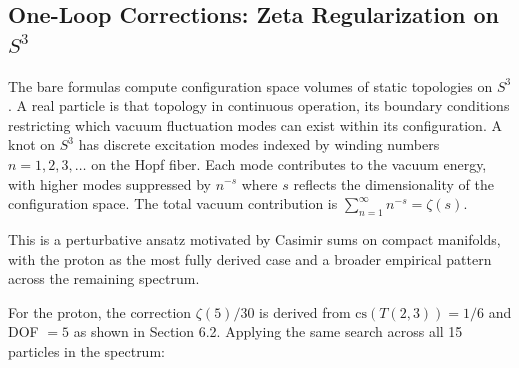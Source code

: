 \subsection{One-Loop Corrections: Zeta Regularization on $S^3$}

The bare formulas compute configuration space volumes of static topologies on $S^3$. A real particle is that topology in continuous operation, its boundary conditions restricting which vacuum fluctuation modes can exist within its configuration. A knot on $S^3$ has discrete excitation modes indexed by winding numbers $n = 1, 2, 3, \ldots$ on the Hopf fiber. Each mode contributes to the vacuum energy, with higher modes suppressed by $n^{-s}$ where $s$ reflects the dimensionality of the configuration space. The total vacuum contribution is $\sum_{n=1}^{\infty} n^{-s} = \zeta(s)$.

This is a perturbative ansatz motivated by Casimir sums on compact manifolds, with the proton as the most fully derived case and a broader empirical pattern across the remaining spectrum.

For the proton, the correction $\zeta(5)/30$ is derived from $\mathrm{cs}(T(2,3)) = 1/6$ and DOF $= 5$ as shown in Section 6.2. Applying the same search across all 15 particles in the spectrum:

